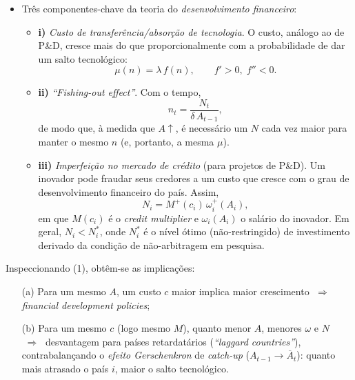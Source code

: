 \documentclass[a4paper,12pt]{article}[abntex2]
\begin{document}
\begin{itemize}
    \item Três componentes-chave da teoria do \textit{desenvolvimento financeiro}:
          \begin{itemize}
              \item \textbf{i)} \textit{Custo de transferência/absorção de tecnologia}.  
                    O custo, análogo ao de P\&D, cresce mais do que proporcionalmente com a probabilidade de dar um salto tecnológico:
                    \[
                        \mu(n)=\lambda\,f(n), \qquad f'>0,\;f''<0.
                    \]
              \item \textbf{ii)} \textit{“Fishing-out effect”}.  
                    Com o tempo,
                    \[
                        n_t=\frac{N_t}{\delta\,A_{t-1}},
                    \]
                    de modo que, à medida que $A\uparrow$, é necessário um $N$ cada vez maior para manter o mesmo $n$ (e, portanto, a mesma $\mu$).
              \item \textbf{iii)} \textit{Imperfeição no mercado de crédito} (para projetos de P\&D).  
                    Um inovador pode fraudar seus credores a um custo que cresce com o grau de desenvolvimento financeiro do país.  Assim,
                    \[
                        N_i = M^{+}(c_i)\,\omega_i^{+}(A_i), \tag{1}
                    \]
                    em que $M(c_i)$ é o \emph{credit multiplier} e $\omega_i(A_i)$ o salário do inovador.  
                    Em geral, $N_i < N_i^{\ast}$, onde $N_i^{\ast}$ é o nível ótimo (não-restringido) de investimento derivado da condição de não-arbitragem em pesquisa.
          \end{itemize}
\end{itemize}

\noindent Inspeccionando (1), obtêm-se as implicações:

\begin{itemize}
    \item[(a)] Para um mesmo $A$, um custo $c$ maior implica maior crescimento $\;\Longrightarrow\;$ \textit{financial development policies};
    \item[(b)] Para um mesmo $c$ (logo mesmo $M$), quanto menor $A$, menores $\omega$ e $N$ $\;\Longrightarrow\;$ desvantagem para países retardatários (\textit{``laggard countries''}), contrabalançando o \textit{efeito Gerschenkron} de \textit{catch-up} ($A_{t-1}\rightarrow\overline{A}_{t}$): quanto mais atrasado o país $i$, maior o salto tecnológico.
\end{itemize}
\end{document}
